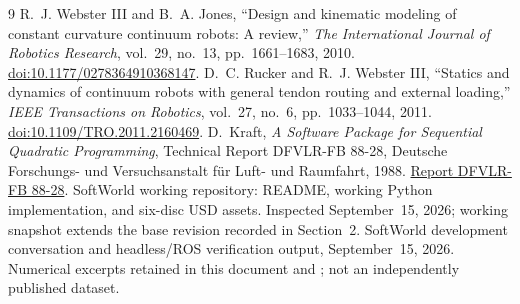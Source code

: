 \documentclass[11pt,letterpaper]{article}
\begin{document}
\begin{thebibliography}{9}
R.~J. Webster III and B.~A. Jones,
``Design and kinematic modeling of constant curvature continuum robots:
A review,'' \emph{The International Journal of Robotics Research},
vol.~29, no.~13, pp.~1661--1683, 2010.
\href{https://doi.org/10.1177/0278364910368147}{doi:10.1177/0278364910368147}.
D.~C. Rucker and R.~J. Webster III,
``Statics and dynamics of continuum robots with general tendon routing and
external loading,'' \emph{IEEE Transactions on Robotics}, vol.~27, no.~6,
pp.~1033--1044, 2011.
\href{https://doi.org/10.1109/TRO.2011.2160469}{doi:10.1109/TRO.2011.2160469}.
D.~Kraft, \emph{A Software Package for Sequential Quadratic Programming},
Technical Report DFVLR-FB 88-28, Deutsche Forschungs- und Versuchsanstalt
f\"ur Luft- und Raumfahrt, 1988.
\href{https://degenerateconic.com/uploads/2018/03/DFVLR_FB_88_28.pdf}
{Report DFVLR-FB 88-28}.
SoftWorld working repository: README, working Python implementation, and
six-disc USD assets. Inspected September~15, 2026; working snapshot extends
the base revision recorded in Section~2.
SoftWorld development conversation and headless/ROS verification output,
September~15, 2026. Numerical excerpts retained in this document and
; not an independently published dataset.
\end{thebibliography}

\appendix
\end{document}

